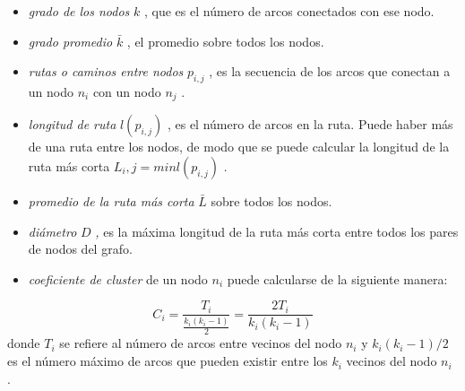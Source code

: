 \documentclass[letterpaper]{article}
\newcommand\textstylebibuscitbase[1]{#1}
\newcommand\liststyleLviii{%
\renewcommand\labelitemi{{\textbullet}}
\renewcommand\labelitemii{${\circ}$}
\renewcommand\labelitemiii{${\blacksquare}$}
\renewcommand\labelitemiv{{\textbullet}}
}
\begin{document}
\liststyleLviii
\begin{itemize}
\item {\sffamily
\textstylebibuscitbase{\textit{grado de los nodos }} $k$
\textstylebibuscitbase{, que es el n\'umero de arcos conectados con ese
}\textstylebibuscitbase{nodo.}}
\item {\sffamily
\textstylebibuscitbase{\textit{grado promedio }} $\bar{k}$
\textstylebibuscitbase{, el promedio sobre todos los nodos.}}
\item {\sffamily
\textstylebibuscitbase{\textit{rutas o caminos entre
nodos}}\textstylebibuscitbase{ } $p_{i,j}$ \textstylebibuscitbase{, es
la secuencia de los arcos que conectan a }\textstylebibuscitbase{un
nodo } $n_{i}$ \textstylebibuscitbase{con un nodo } $n_{j}$
\textstylebibuscitbase{.}}
\item {\sffamily
\textstylebibuscitbase{\textit{longitud de ruta}}\textstylebibuscitbase{
} $l(p_{i,j})$ \textstylebibuscitbase{, es el n\'umero de arcos en la
ruta. Puede haber }\textstylebibuscitbase{m\'as de una ruta entre los
nodos, de modo que se puede calcular la longitud de la ruta m\'as corta
} $L_{i},j=\mathit{min}l(p_{i,j})$ \textstylebibuscitbase{.}}
\item {\sffamily
\textstylebibuscitbase{\textit{promedio de la ruta m\'as
corta}}\textstylebibuscitbase{ } $\bar{L}$ \textstylebibuscitbase{sobre
todos los nodos. }}
\item {\sffamily
\textstylebibuscitbase{\textit{di\'ametro }} $D$
\textstylebibuscitbase{\textit{, }}\textstylebibuscitbase{es la
m\'axima longitud de la ruta m\'as corta entre todos los
}\textstylebibuscitbase{pares de nodos del grafo.}}
\item {\sffamily
\textstylebibuscitbase{\textit{coeficiente de
cluster}}\textstylebibuscitbase{ de un nodo } $n_{i}$
\textstylebibuscitbase{puede calcularse de la siguiente manera:}}
\end{itemize}
\begin{equation*}
C_{i}=\frac{T_{i}}{\frac{k_{i}(k_{i}-1)}{2}}=\frac{2T_{i}}{k_{i}(k_{i}-1)}
\end{equation*}
{\sffamily
\textstylebibuscitbase{donde } $T_{i}$ \textstylebibuscitbase{se refiere
al n\'umero de arcos entre vecinos del nodo } $n_{i}$
\textstylebibuscitbase{y } $k_{i}(k_{i}-1)/{2}$
\textstylebibuscitbase{es el n\'umero m\'aximo de arcos que pueden
existir entre los } $k_{i}$ \textstylebibuscitbase{vecinos del nodo }
$n_{i}$ \textstylebibuscitbase{.}}
\end{document}
